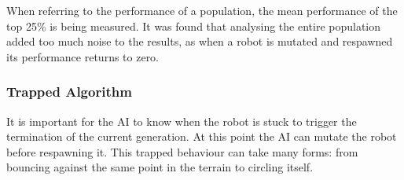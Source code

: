 \documentclass{article}
\begin{document}
When referring to the performance of a population, the mean performance of the top 25\% is being measured. It was found that analysing the entire population added too much noise to the results, as when a robot is mutated and respawned its performance returns to zero.

\subsubsection{Trapped Algorithm}
\label{sec:Trapped Imp}
It is important for the AI to know when the robot is stuck to trigger the termination of the current generation. At this point the AI can mutate the robot before respawning it. This trapped behaviour can take many forms: from bouncing against the same point in the terrain to circling itself.\\
\end{document}
